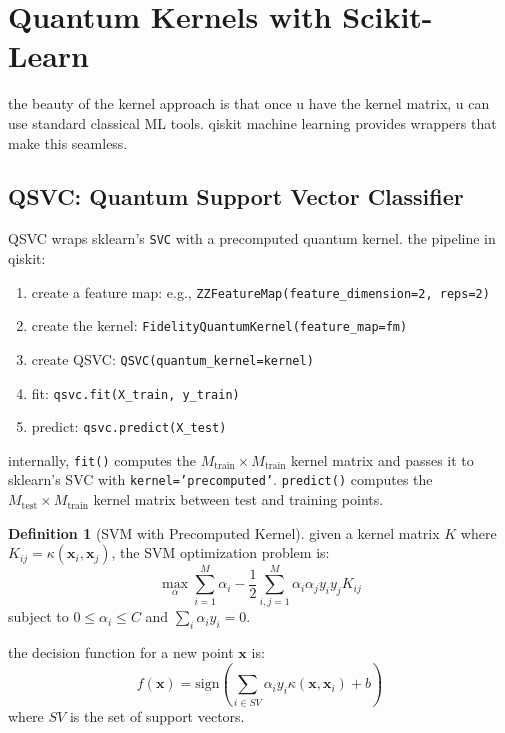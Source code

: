 \documentclass[11pt,a4paper]{article}
\theoremstyle{definition}
\newtheorem{definition}{Definition}[section]
\theoremstyle{remark}
\begin{document}
\section{Quantum Kernels with Scikit-Learn}

the beauty of the kernel approach is that once u have the kernel matrix, u can use standard classical ML tools. qiskit machine learning provides wrappers that make this seamless.

\subsection{QSVC: Quantum Support Vector Classifier}

QSVC wraps sklearn's \texttt{SVC} with a precomputed quantum kernel. the pipeline in qiskit:

\begin{enumerate}[leftmargin=*]
    \item create a feature map: e.g., \texttt{ZZFeatureMap(feature\_dimension=2, reps=2)}
    \item create the kernel: \texttt{FidelityQuantumKernel(feature\_map=fm)}
    \item create QSVC: \texttt{QSVC(quantum\_kernel=kernel)}
    \item fit: \texttt{qsvc.fit(X\_train, y\_train)}
    \item predict: \texttt{qsvc.predict(X\_test)}
\end{enumerate}

internally, \texttt{fit()} computes the $M_{\text{train}} \times M_{\text{train}}$ kernel matrix and passes it to sklearn's SVC with \texttt{kernel='precomputed'}. \texttt{predict()} computes the $M_{\text{test}} \times M_{\text{train}}$ kernel matrix between test and training points.

\begin{definition}[SVM with Precomputed Kernel]
given a kernel matrix $K$ where $K_{ij} = \kappa(\mathbf{x}_i, \mathbf{x}_j)$, the SVM optimization problem is:
\[
\max_{\alpha} \sum_{i=1}^M \alpha_i - \frac{1}{2} \sum_{i,j=1}^M \alpha_i \alpha_j y_i y_j K_{ij}
\]
subject to $0 \leq \alpha_i \leq C$ and $\sum_i \alpha_i y_i = 0$.

the decision function for a new point $\mathbf{x}$ is:
\[
f(\mathbf{x}) = \text{sign}\!\left(\sum_{i \in SV} \alpha_i y_i \kappa(\mathbf{x}, \mathbf{x}_i) + b\right)
\]
where $SV$ is the set of support vectors.
\end{definition}
\end{document}
